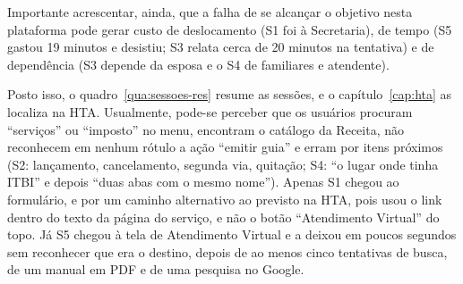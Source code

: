 \documentclass[
  12pt,
  oneside,
  a4paper,
  chapter=TITLE,
  section=TITLE,
  english,
  brazilian
]{abntex2}
\begin{document}
Importante acrescentar, ainda, que a falha de se alcançar o objetivo nesta plataforma pode gerar custo
de deslocamento (S1 foi à Secretaria), de tempo (S5 gastou 19 minutos e desistiu;
S3 relata cerca de 20 minutos na tentativa) e de dependência (S3 depende da
esposa e o S4 de familiares e atendente).

Posto isso, o quadro~\ref{qua:sessoes-res} resume as sessões, e o
capítulo~\ref{cap:hta} as localiza na HTA. Usualmente, pode-se perceber que os usuários procuram ``serviços'' ou ``imposto'' no menu, encontram o catálogo da Receita, não
reconhecem em nenhum rótulo a ação ``emitir guia'' e erram por itens próximos
(S2: lançamento, cancelamento, segunda via, quitação; S4: ``o lugar onde tinha
ITBI'' e depois ``duas abas com o mesmo nome''). Apenas S1 chegou ao formulário, e
por um caminho alternativo ao previsto na HTA, pois usou o link dentro do texto da
página do serviço, e não o botão ``Atendimento Virtual'' do topo. Já S5 chegou à tela de Atendimento Virtual e a deixou
em poucos segundos sem reconhecer que era o destino, depois de ao menos cinco
tentativas de busca, de um manual em PDF e de uma pesquisa no Google.
\end{document}
